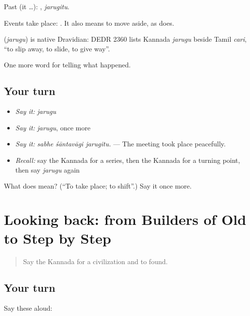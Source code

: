 Past (it …): , \emph{jarugitu}.

Events take place:  . It also means to move aside, as  does.

\begin{cousinweb}
\textbf{} (\emph{jarugu}) is native Dravidian: DEDR 2360 lists Kannada \emph{jarugu} beside Tamil \emph{cari}, \textquotedblleft{}to slip away, to slide, to give way\textquotedblright{}.
\end{cousinweb}

\begin{grammarlens}[title={What you've built}]
One more word for telling what happened.
\end{grammarlens}

\subsection*{Your turn}
\begin{itemize}
\raggedright
  \item \emph{Say it:} \emph{jarugu}
  \item \emph{Say it:} \emph{jarugu}, once more
  \item \emph{Say it:} \emph{sabhe śāntavāgi jarugitu.} — The meeting took place peacefully.
  \item \emph{Recall:} say the Kannada for a series, then the Kannada for a turning point, then say \emph{jarugu} again
\end{itemize}

\begin{tcolorbox}[breakable,colback=teal!4,colframe=teal!35!black,title={Before you move on}]
What does  mean? (\textquotedblleft{}To take place; to shift\textquotedblright{}.) Say it once more.
\end{tcolorbox}
\section[(dialogue)]{Looking back: from Builders of Old to Step by Step}

\label{lesson:KA-R368-review-362-368}



\begin{quote}
Say the Kannada for a civilization and to found.
\end{quote}

\subsection*{Your turn}
Say these aloud:

